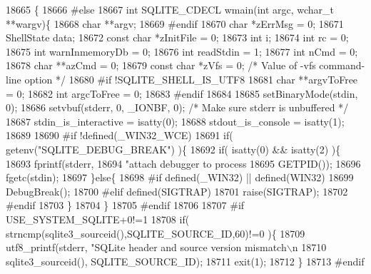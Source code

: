 \begin{DoxyCode}
18665                                             \{
18666 \textcolor{preprocessor}{#else}
18667 \textcolor{keywordtype}{int} SQLITE_CDECL wmain(\textcolor{keywordtype}{int} argc, \textcolor{keywordtype}{wchar\_t} **wargv)\{
18668   \textcolor{keywordtype}{char} **argv;
18669 \textcolor{preprocessor}{#endif}
18670   \textcolor{keywordtype}{char} *zErrMsg = 0;
18671   ShellState data;
18672   \textcolor{keyword}{const} \textcolor{keywordtype}{char} *zInitFile = 0;
18673   \textcolor{keywordtype}{int} i;
18674   \textcolor{keywordtype}{int} rc = 0;
18675   \textcolor{keywordtype}{int} warnInmemoryDb = 0;
18676   \textcolor{keywordtype}{int} readStdin = 1;
18677   \textcolor{keywordtype}{int} nCmd = 0;
18678   \textcolor{keywordtype}{char} **azCmd = 0;
18679   \textcolor{keyword}{const} \textcolor{keywordtype}{char} *zVfs = 0;           \textcolor{comment}{/* Value of -vfs command-line option */}
18680 \textcolor{preprocessor}{#if !SQLITE\_SHELL\_IS\_UTF8}
18681   \textcolor{keywordtype}{char} **argvToFree = 0;
18682   \textcolor{keywordtype}{int} argcToFree = 0;
18683 \textcolor{preprocessor}{#endif}
18684 
18685   setBinaryMode(stdin, 0);
18686   setvbuf(stderr, 0, \_IONBF, 0); \textcolor{comment}{/* Make sure stderr is unbuffered */}
18687   stdin_is_interactive = isatty(0);
18688   stdout_is_console = isatty(1);
18689 
18690 \textcolor{preprocessor}{#if !defined(\_WIN32\_WCE)}
18691   \textcolor{keywordflow}{if}( getenv(\textcolor{stringliteral}{"SQLITE\_DEBUG\_BREAK"}) )\{
18692     \textcolor{keywordflow}{if}( isatty(0) && isatty(2) )\{
18693       fprintf(stderr,
18694           \textcolor{stringliteral}{"attach debugger to process %
18695           GETPID());
18696       fgetc(stdin);
18697     \}\textcolor{keywordflow}{else}\{
18698 \textcolor{preprocessor}{#if defined(\_WIN32) || defined(WIN32)}
18699       DebugBreak();
18700 \textcolor{preprocessor}{#elif defined(SIGTRAP)}
18701       \textcolor{keyword}{raise}(SIGTRAP);
18702 \textcolor{preprocessor}{#endif}
18703     \}
18704   \}
18705 \textcolor{preprocessor}{#endif}
18706 
18707 \textcolor{preprocessor}{#if USE\_SYSTEM\_SQLITE+0!=1}
18708   \textcolor{keywordflow}{if}( strncmp(sqlite3_sourceid(),SQLITE_SOURCE_ID,60)!=0 )\{
18709     utf8_printf(stderr, \textcolor{stringliteral}{"SQLite header and source version mismatch\(\backslash\)n%
18710             sqlite3_sourceid(), SQLITE_SOURCE_ID);
18711     exit(1);
18712   \}
18713 \textcolor{preprocessor}{#endif}
}}
\end{DoxyCode}
